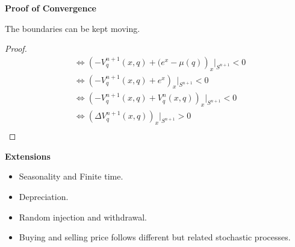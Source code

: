 \documentclass{beamer}
\begin{document}
\begin{frame}
{\bf Proof of Convergence}
\begin{Theorem}
The boundaries can be kept moving. 
\end{Theorem}
\begin{proof}
\begin{equation*}
\begin{split} 
&\Leftrightarrow \left(-V_q^{n+1}(x,q) + (e^x - \mu(q)\right)_x|_{S^{n+1}} < 0\\ 
&\Leftrightarrow \left(-V_q^{n+1}(x,q) + e^x \right)_x|_{S^{n+1}} < 0\\
&\Leftrightarrow \left(-V_q^{n+1}(x,q) + V_q^{n}(x,q) \right)_x|_{S^{n+1}} < 0\\
&\Leftrightarrow \left(\Delta V_q^{n+1}(x,q)\right)_x|_{S^{n+1}} > 0\\
\end{split}
\end{equation*}


\end{proof}




\end{frame}




\begin{frame}
{\bf Extensions}

\begin{itemize}
  \item Seasonality and Finite time.
  \item Depreciation.
  \item Random injection and withdrawal.
  \item Buying and selling price follows different but related stochastic processes. 
\end{itemize}

\end{frame}
\end{document}
